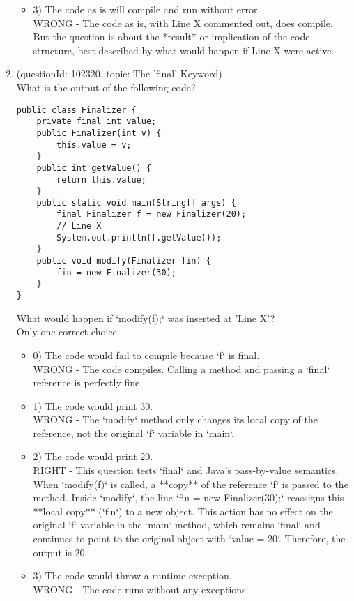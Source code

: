 \documentclass[12pt]{article}
\begin{document}
\begin{enumerate}[label=(\arabic*)]
\begin{itemize}
\item 3) The code as is will compile and run without error.
 \\ 
WRONG - The code as is, with Line X commented out, does compile. But the question is about the *result* or implication of the code structure, best described by what would happen if Line X were active.

\end{itemize}
\item (questionId: 102320, topic: The 'final' Keyword) \\ 
What is the output of the following code?\n\begin{verbatim}
public class Finalizer {
    private final int value;
    public Finalizer(int v) {
        this.value = v;
    }
    public int getValue() {
        return this.value;
    }
    public static void main(String[] args) {
        final Finalizer f = new Finalizer(20);
        // Line X
        System.out.println(f.getValue());
    }
    public void modify(Finalizer fin) {
        fin = new Finalizer(30);
    }
}
\end{verbatim}
What would happen if `modify(f);` was inserted at 'Line X'?
\\ \noindent Only one correct choice. 
\begin{itemize}
\item 0) The code would fail to compile because `f` is final.
 \\ 
WRONG - The code compiles. Calling a method and passing a `final` reference is perfectly fine.

\item 1) The code would print 30.
 \\ 
WRONG - The `modify` method only changes its local copy of the reference, not the original `f` variable in `main`.

\item 2) The code would print 20.
 \\ 
RIGHT - This question tests `final` and Java's pass-by-value semantics. When `modify(f)` is called, a **copy** of the reference `f` is passed to the method. Inside `modify`, the line `fin = new Finalizer(30);` reassigns this **local copy** (`fin`) to a new object. This action has no effect on the original `f` variable in the `main` method, which remains `final` and continues to point to the original object with `value = 20`. Therefore, the output is 20.

\item 3) The code would throw a runtime exception.
 \\ 
WRONG - The code runs without any exceptions.


\end{itemize}
\end{enumerate}
\end{document}
